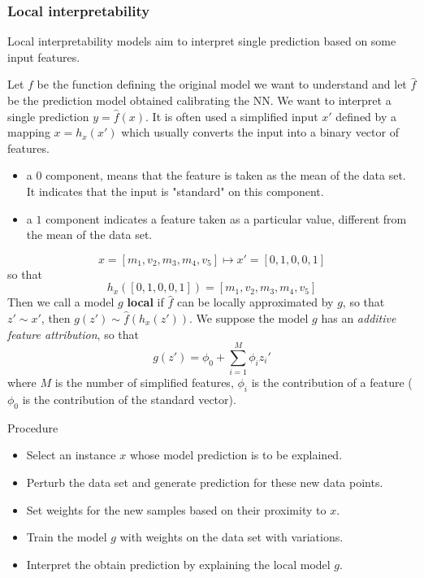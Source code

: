 \documentclass{beamer}
\theoremstyle{plain}
\theoremstyle{definition}
\theoremstyle{remark}
\begin{document}
\begin{frame}
	\frametitle{Local interpretability}
	Local interpretability models aim to interpret single prediction based on some input features.
	
	Let $f$ be the function defining the original model we want to understand and let $\hat{f}$ be the prediction model obtained calibrating the NN. We want to interpret a single prediction $y = \hat{f}(x)$.\newline
	It is often used a simplified input $x'$ defined by a mapping $x=h_x(x')$ which usually converts the input into a binary vector of features.
	\begin{itemize}
		\item a $0$ component, means that the feature is taken as the mean of the data set. It indicates that the input is "standard" on this component.
		\item a $1$ component indicates a feature taken as a particular value, different from the mean of the data set.
	\end{itemize}
\end{frame}

\begin{frame}
	\begin{equation}
		x = [m_1, v_2, m_3, m_4, v_5] \mapsto x' = [0,1,0,0,1]
	\end{equation}
	so that
	\begin{equation}
		h_x([0,1,0,0,1]) = [m_1, v_2, m_3, m_4, v_5]
	\end{equation}
	Then we call a model $g$ \textbf{local} if $\hat{f}$ can be locally approximated by $g$, so that $z' \sim x'$, then $g(z')\sim \hat{f}(h_x(z'))$.\newline
	We suppose the model $g$ has an \textit{additive feature attribution}, so that
	\begin{equation}
		g(z')=\phi_0 + \sum_{i = 1}^{M}{\phi_iz_i'}
	\end{equation}
	where $M$ is the number of simplified features, $\phi_i$ is the contribution of a feature ($\phi_0$ is the contribution of the standard vector).
\end{frame}

\begin{frame}
	\begin{block}{Procedure}
		\begin{itemize}
			\item Select an instance $x$ whose model prediction is to be explained.
			\item Perturb the data set and generate prediction for these new data points.
			\item Set weights for the new samples based on their proximity to $x$.
			\item Train the model $g$ with weights on the data set with variations.
			\item Interpret the obtain prediction by explaining the local model $g$.
		\end{itemize}
	\end{block}
\end{frame}
\end{document}
